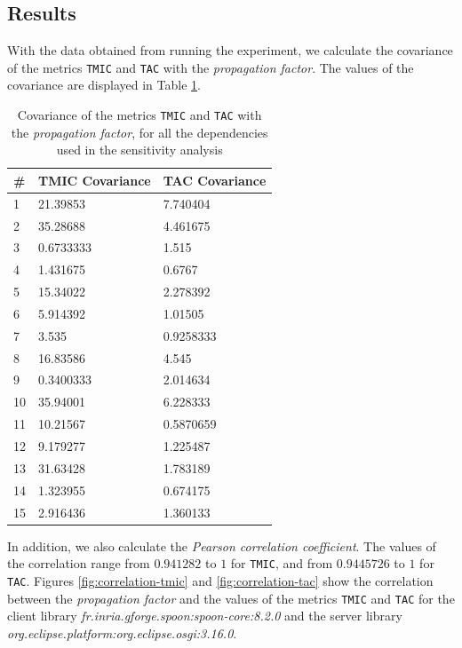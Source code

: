 \subsection{Results}
With the data obtained from running the experiment, we calculate the covariance of the metrics \texttt{TMIC} and \texttt{TAC} with the \textit{propagation factor}. The values of the covariance are displayed in Table \ref{table:covariance-sensitivity}.

\begin{table}[ht!]
\begin{center}
\begin{tabular}{|l|l|l|}
\hline
\# & \textbf{TMIC Covariance} & \textbf{TAC Covariance} \\ \hline
1 & 21.39853 & 7.740404 \\ \hline
2 & 35.28688 & 4.461675 \\ \hline
3 & 0.6733333 & 1.515 \\ \hline
4 & 1.431675 & 0.6767 \\ \hline
5 & 15.34022 & 2.278392 \\ \hline
6 & 5.914392 & 1.01505 \\ \hline
7 & 3.535 & 0.9258333 \\ \hline
8 & 16.83586 & 4.545 \\ \hline
9 & 0.3400333 & 2.014634 \\ \hline
10 & 35.94001 & 6.228333 \\ \hline
11 & 10.21567 & 0.5870659 \\ \hline
12 & 9.179277 & 1.225487 \\ \hline
13 & 31.63428 & 1.783189 \\ \hline
14 & 1.323955 & 0.674175 \\ \hline
15 & 2.916436 & 1.360133 \\ \hline
\end{tabular}
\end{center}
\caption{Covariance of the metrics \texttt{TMIC} and \texttt{TAC} with the \textit{propagation factor}, for all the dependencies used in the sensitivity analysis}
\label{table:covariance-sensitivity}
\end{table}

In addition, we also calculate the \textit{Pearson correlation coefficient}. The values of the correlation range from $0.941282$ to $1$ for \texttt{TMIC}, and from $0.9445726$ to $1$ for \texttt{TAC}. Figures \ref{fig:correlation-tmic} and \ref{fig:correlation-tac} show the correlation between the \textit{propagation factor} and the values of the metrics \texttt{TMIC} and \texttt{TAC} for the client library \textit{fr.inria.gforge.spoon:spoon-core:8.2.0} and the server library \textit{org.eclipse.platform:org.eclipse.osgi:3.16.0}.

